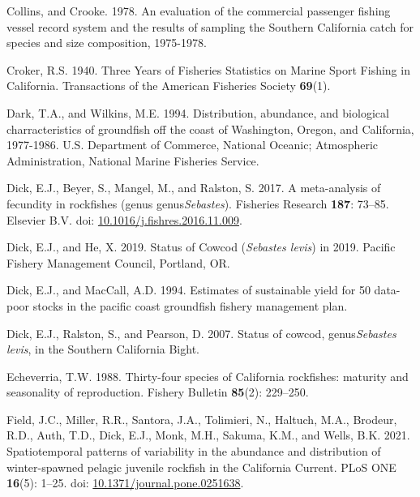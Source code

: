 \documentclass[
  english,
  a4paper,
]{article}
\newlength{\cslhangindent}
\newlength{\cslentryspacingunit} %
\newenvironment{CSLReferences}[2] %
 {%
  \setlength{\parindent}{0pt}
  \ifodd #1
  \let\oldpar\par
  \def\par{\hangindent=\cslhangindent\oldpar}
  \fi
  \setlength{\parskip}{#2\cslentryspacingunit}
 }%
 {}
\begin{document}
\begin{CSLReferences}{1}{0}
\leavevmode{}%
Collins, and Crooke. 1978. {An evaluation of the commercial passenger fishing vessel record system and the results of sampling the Southern California catch for species and size composition, 1975-1978.}

\leavevmode{}%
Croker, R.S. 1940. {Three Years of Fisheries Statistics on Marine Sport Fishing in California}. Transactions of the American Fisheries Society \textbf{69}(1).

\leavevmode{}%
Dark, T.A., and Wilkins, M.E. 1994. {Distribution, abundance, and biological charracteristics of groundfish off the coast of Washington, Oregon, and California, 1977-1986}. U.S. Department of Commerce, National Oceanic; Atmospheric Administration, National Marine Fisheries Service.

\leavevmode{}%
Dick, E.J., Beyer, S., Mangel, M., and Ralston, S. 2017. {A meta-analysis of fecundity in rockfishes (genus genus\emph{Sebastes})}. Fisheries Research \textbf{187}: 73--85. Elsevier B.V. doi: \href{https://doi.org/10.1016/j.fishres.2016.11.009}{10.1016/j.fishres.2016.11.009}.

\leavevmode{}%
Dick, E.J., and He, X. 2019. {Status of Cowcod (\emph{Sebastes levis}) in 2019}. Pacific Fishery Management Council, Portland, OR.

\leavevmode{}%
Dick, E.J., and MacCall, A.D. 1994. {Estimates of sustainable yield for 50 data-poor stocks in the pacific coast groundfish fishery management plan}.

\leavevmode{}%
Dick, E.J., Ralston, S., and Pearson, D. 2007. {Status of cowcod, genus\emph{Sebastes levis}, in the Southern California Bight}.

\leavevmode{}%
Echeverria, T.W. 1988. {Thirty-four species of California rockfishes: maturity and seasonality of reproduction}. Fishery Bulletin \textbf{85}(2): 229--250.

\leavevmode{}%
Field, J.C., Miller, R.R., Santora, J.A., Tolimieri, N., Haltuch, M.A., Brodeur, R.D., Auth, T.D., Dick, E.J., Monk, M.H., Sakuma, K.M., and Wells, B.K. 2021. {Spatiotemporal patterns of variability in the abundance and distribution of winter-spawned pelagic juvenile rockfish in the California Current}. PLoS ONE \textbf{16}(5): 1--25. doi: \href{https://doi.org/10.1371/journal.pone.0251638}{10.1371/journal.pone.0251638}.


\end{CSLReferences}
\end{document}
